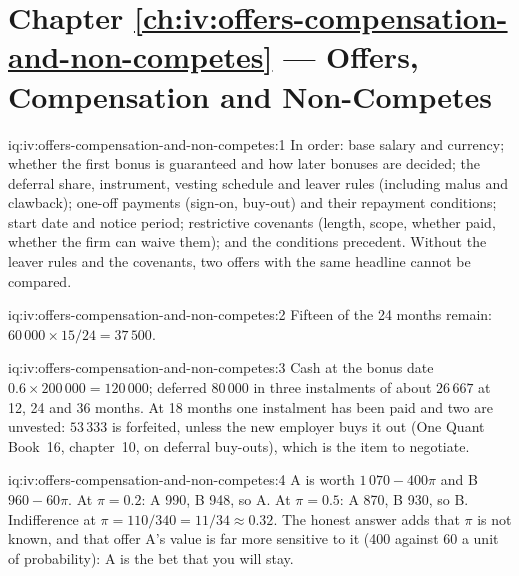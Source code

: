 \section*{Chapter \ref{ch:iv:offers-compensation-and-non-competes} --- Offers, Compensation and Non-Competes}

\begin{solution}{iq:iv:offers-compensation-and-non-competes:1}
In order: base salary and currency; whether the first bonus is guaranteed and how later bonuses are decided;
the deferral share, instrument, vesting schedule and leaver rules (including malus and clawback); one-off
payments (sign-on, buy-out) and their repayment conditions; start date and notice period; restrictive
covenants (length, scope, whether paid, whether the firm can waive them); and the conditions precedent. Without
the leaver rules and the covenants, two offers with the same headline cannot be compared.
\end{solution}

\begin{solution}{iq:iv:offers-compensation-and-non-competes:2}
Fifteen of the 24 months remain: $60\,000 \times 15/24 = 37\,500$.
\end{solution}

\begin{solution}{iq:iv:offers-compensation-and-non-competes:3}
Cash at the bonus date $0.6 \times 200\,000 = 120\,000$; deferred $80\,000$ in three instalments of about
$26\,667$ at 12, 24 and 36 months. At 18 months one instalment has been paid and two are unvested:
$53\,333$ is forfeited, unless the new employer buys it out (One Quant Book~16, chapter~10, on deferral
buy-outs), which is the item to negotiate.
\end{solution}

\begin{solution}{iq:iv:offers-compensation-and-non-competes:4}
A is worth $1\,070 - 400\pi$ and B $960 - 60\pi$. At $\pi = 0.2$: A 990, B 948, so A. At $\pi = 0.5$: A
870, B 930, so B. Indifference at $\pi = 110/340 = 11/34 \approx 0.32$. The honest answer adds that $\pi$ is
not known, and that offer A's value is far more sensitive to it (400 against 60 a unit of probability): A is
the bet that you will stay.
\end{solution}

